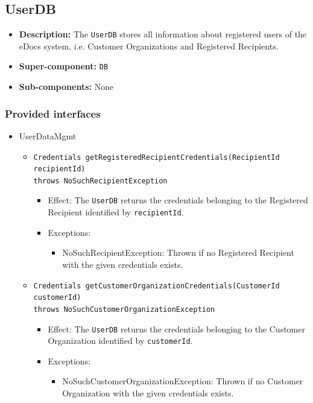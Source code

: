 \documentclass[a4paper,10pt]{article}
\begin{document}
\subsection{UserDB}
\begin{itemize}
    \item \textbf{Description:} The \texttt{UserDB} stores all information about registered users of the eDocs system, i.e. Customer Organizations and Registered Recipients.
    \item \textbf{Super-component:} \texttt{DB}
    \item \textbf{Sub-components:} None
\end{itemize}

\subsubsection*{Provided interfaces}
\begin{itemize}
    \item UserDataMgmt
    \begin{itemize}
        \item \texttt{Credentials getRegisteredRecipientCredentials(RecipientId recipientId) \\throws NoSuchRecipientException}
        \begin{itemize}
            \item Effect: The \texttt{UserDB} returns the credentials belonging to the Registered Recipient identified by \texttt{recipientId}.
            \item Exceptions:
            \begin{itemize}
                \item NoSuchRecipientException: Thrown if no Registered Recipient with the given credentials exists.
            \end{itemize}
		\end{itemize}
            
        \item \texttt{Credentials getCustomerOrganizationCredentials(CustomerId customerId) \\ throws NoSuchCustomerOrganizationException}
        \begin{itemize}
            \item Effect: The \texttt{UserDB} returns the credentials belonging to the Customer Organization identified by \texttt{customerId}.
            \item Exceptions:
            \begin{itemize}
                \item NoSuchCustomerOrganizationException: Thrown if no Customer Organization with the given credentials exists.
            \end{itemize}
        \end{itemize}
    \end{itemize}
\end{itemize}
\end{document}
